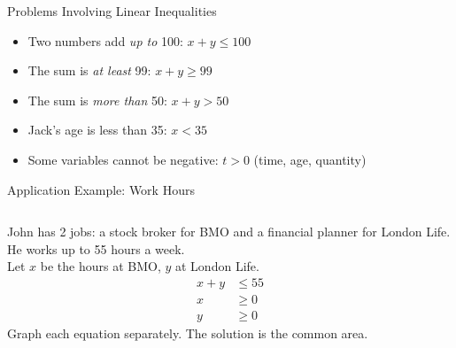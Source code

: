 \documentclass[aspectratio=169]{beamer}
\begin{document}
\begin{frame}{Problems Involving Linear Inequalities}
    \begin{tcolorbox}[colback=lightgray,colframe=primary,title=Translating Words to Inequalities]
        \footnotesize
        \begin{itemize}
            \item Two numbers add \textit{up to} 100: $x + y \leq 100$
            \item The sum is \textit{at least} 99: $x + y \geq 99$
            \item The sum is \textit{more than} 50: $x + y > 50$
            \item Jack's age is less than 35: $x < 35$
            \item Some variables cannot be negative: $t > 0$ (time, age, quantity)
        \end{itemize}
    \end{tcolorbox}
\end{frame}

\begin{frame}{Application Example: Work Hours}
    \begin{columns}
        \footnotesize
        John has 2 jobs: a stock broker for BMO and a financial planner for London Life. He works up to 55 hours a week.\\
        Let $x$ be the hours at BMO, $y$ at London Life.\\
        \begin{align*}
            x + y &\leq 55 \\
            x &\geq 0 \\
            y &\geq 0
        \end{align*}
        Graph each equation separately. The solution is the common area.
    \end{columns}
\end{frame}
\end{document}
